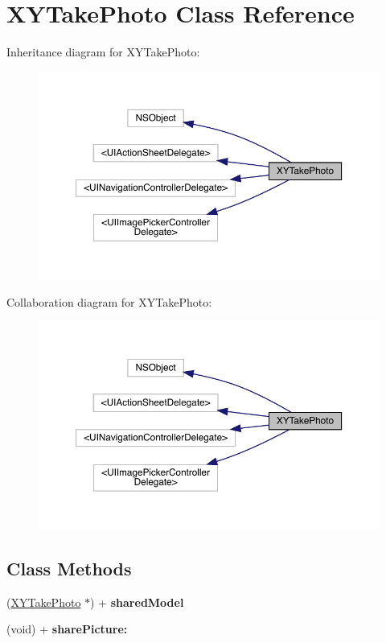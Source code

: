 \hypertarget{interface_x_y_take_photo}{}\section{X\+Y\+Take\+Photo Class Reference}
\label{interface_x_y_take_photo}


Inheritance diagram for X\+Y\+Take\+Photo\+:\nopagebreak
\begin{figure}[H]
\begin{center}
\leavevmode
\includegraphics[width=350pt]{interface_x_y_take_photo__inherit__graph}
\end{center}
\end{figure}


Collaboration diagram for X\+Y\+Take\+Photo\+:\nopagebreak
\begin{figure}[H]
\begin{center}
\leavevmode
\includegraphics[width=350pt]{interface_x_y_take_photo__coll__graph}
\end{center}
\end{figure}
\subsection*{Class Methods}
\begin{DoxyCompactItemize}
\item 
(\mbox{\hyperlink{interface_x_y_take_photo}{X\+Y\+Take\+Photo}} $\ast$) + {\bfseries shared\+Model}
\item 
\mbox{\label{interface_x_y_take_photo_ae3f008c7edc9e071baab0d26ebf7d5b4}} 
(void) + {\bfseries share\+Picture\+:}
\end{DoxyCompactItemize}
